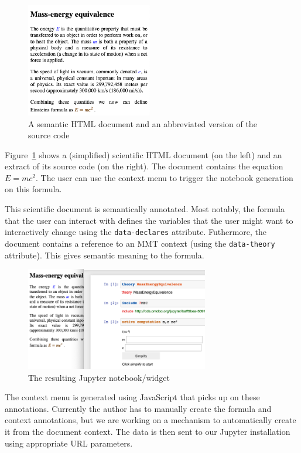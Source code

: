\begin{figure}[h]
  \begin{minipage}[c]{5.5cm}
  \vspace{-20pt}
  \includegraphics[width=5.5cm]{screenshots/sciencedoc}
  \end{minipage}
  \begin{minipage}[c]{7cm}
    
  \end{minipage}
  \caption{A semantic HTML document and an abbreviated version of the source code}\label{fig:conversionHTML}
\end{figure}

Figure~\ref{fig:conversionHTML} shows a (simplified) scientific HTML document (on the left) and an extract of its source code (on the right).
The document contains the equation $E=mc^2$. 
The user can use the context menu to trigger the notebook generation on this formula.

This scientific document is semantically annotated. 
Most notably, the formula that the user can interact with defines the variables that the user might want to interactively change using the \texttt{data-declares} attribute. 
Futhermore, the document contains a reference to an MMT context (using the \texttt{data-theory} attribute). 
This gives semantic meaning to the formula. 

\begin{figure}\vspace*{-2em}
  \includegraphics[width=8cm]{screenshots/emc}\vspace*{-1em}
\caption{The resulting Jupyter notebook/widget}\label{fig:conversionNotebook}\vspace*{-2em}
\end{figure}
The context menu is generated using JavaScript that picks up on these annotations.
Currently the author has to manually create the formula and context annotations, but we are working on a mechanism to automatically create it from the document context.
The data is then sent to our Jupyter installation using appropriate URL parameters. 

